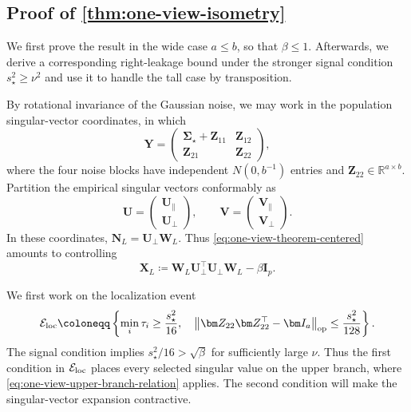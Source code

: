 \documentclass[11pt]{article}
\newcommand{\R}{\mathbb{R}}
\newcommand{\trans}{\top}
\newcommand{\opn}[1]{\left\lVert #1\right\rVert_{\mathrm{op}}}
\newcommand{\cE}{\mathcal{E}}
\begin{document}
\subsection{Proof of \cref{thm:one-view-isometry}}
\label{app:proof-one-view-isometry}

We first prove the result in the wide case $a\le b$, so that $\beta\le1$.
Afterwards, we derive a corresponding right-leakage bound under the stronger
signal condition $s_\star^2\ge\nu^2$ and use it to handle the tall case by
transposition.




By rotational invariance of the Gaussian noise, we may work in the
population singular-vector coordinates, in which
\begin{equation}
\label{eq:one-view-block-model}
  \bm Y
  =
  \begin{pmatrix}
    \bm\Sigma_\star+\bm Z_{11} & \bm Z_{12}\\
    \bm Z_{21} & \bm Z_{22}
  \end{pmatrix},
\end{equation}
where the four noise blocks have independent $N(0,b^{-1})$ entries and
$\bm Z_{22}\in\R^{a\times b}$. Partition the empirical singular vectors
conformably as
\begin{equation}
\label{eq:one-view-singular-blocks}
  \bm U
  =
  \begin{pmatrix}
    \bm U_\parallel\\
    \bm U_\perp
  \end{pmatrix},
  \qquad
  \bm V
  =
  \begin{pmatrix}
    \bm V_\parallel\\
    \bm V_\perp
  \end{pmatrix}.
\end{equation}
In these coordinates, $\bm N_L=\bm U_\perp\bm W_L$. Thus
\cref{eq:one-view-theorem-centered} amounts to controlling
\begin{equation}
\label{eq:one-view-XL}
  \bm X_L
  \coloneqq
  \bm W_L\bm U_\perp^\trans\bm U_\perp\bm W_L
  -\beta\bm I_p.
\end{equation}

We first work on the localization event
\begin{equation}
\label{eq:one-view-localization-event}
  \cE_{\rm loc}
  \coloneqq
  \left\{
    \min_i\tau_i\ge\frac{s_\star^2}{16},
    \quad
    \opn{\bm Z_{22}\bm Z_{22}^\trans-\bm I_a}
    \le\frac{s_\star^2}{128}
  \right\}.
\end{equation}
The signal condition implies $s_\star^2/16>\sqrt\beta$ for sufficiently
large $\nu$.  Thus the first condition in $\cE_{\rm loc}$ places every
selected singular value on the upper branch, where
\cref{eq:one-view-upper-branch-relation} applies.  The second condition will
make the singular-vector expansion contractive.
\end{document}
